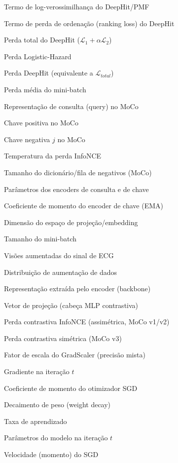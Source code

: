 \begin{simbolos}
	\item[$ \mathcal{L}_1 $] Termo de log-verossimilhança do DeepHit/PMF
	\item[$ \mathcal{L}_2 $] Termo de perda de ordenação (ranking loss) do DeepHit
	\item[$ \mathcal{L}_{total} $] Perda total do DeepHit ($\mathcal{L}_1 + \alpha\mathcal{L}_2$)
	\item[$ \mathcal{L}_{LH} $] Perda Logistic-Hazard
	\item[$ \mathcal{L}_{DH} $] Perda DeepHit (equivalente a $\mathcal{L}_{total}$)
	\item[$ \bar{\mathcal{L}} $] Perda média do mini-batch

	\item[$ q $] Representação de consulta (query) no MoCo
	\item[$ k^+ $] Chave positiva no MoCo
	\item[$ k_j^- $] Chave negativa $j$ no MoCo
	\item[$ \tau $] Temperatura da perda InfoNCE
	\item[$ K_{queue} $] Tamanho do dicionário/fila de negativos (MoCo)
	\item[$ \theta_q, \theta_k $] Parâmetros dos encoders de consulta e de chave
	\item[$ m $] Coeficiente de momento do encoder de chave (EMA)
	\item[$ d_z $] Dimensão do espaço de projeção/embedding
	\item[$ B $] Tamanho do mini-batch
	\item[$ x^{(1)}, x^{(2)} $] Visões aumentadas do sinal de ECG
	\item[$ \mathcal{A} $] Distribuição de aumentação de dados
	\item[$ h $] Representação extraída pelo encoder (backbone)
	\item[$ z $] Vetor de projeção (cabeça MLP contrastiva)
	\item[$ \mathcal{L}_{InfoNCE} $] Perda contrastiva InfoNCE (assimétrica, MoCo v1/v2)
	\item[$ \mathcal{L}_{sym} $] Perda contrastiva simétrica (MoCo v3)

	\item[$ s_t $] Fator de escala do GradScaler (precisão mista)
	\item[$ g_t $] Gradiente na iteração $t$
	\item[$ \beta $] Coeficiente de momento do otimizador SGD
	\item[$ \lambda $] Decaimento de peso (weight decay)
	\item[$ \eta $] Taxa de aprendizado
	\item[$ \theta_t $] Parâmetros do modelo na iteração $t$
	\item[$ v_t $] Velocidade (momento) do SGD


\end{simbolos}
